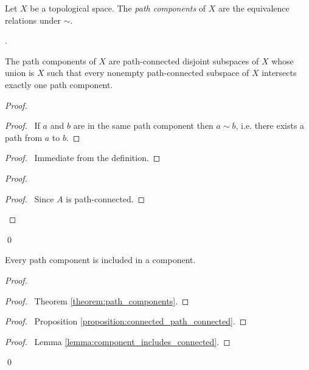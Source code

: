 \begin{definition}
    Let $X$ be a topological space. The \emph{path components} of $X$ are
    the equivalence relations under $\sim$.
\end{definition}.

\begin{theorem}
    \label{theorem:path_components}
    The path components of $X$ are path-connected disjoint subspaces of $X$
    whose union is $X$ such that every nonempty path-connected subspace of $X$
    intersects exactly one path component.
\end{theorem}

\begin{proof}
    \pf
    \begin{proof}
        \pf\ If $a$ and $b$ are in the same path component then $a \sim b$,
        i.e. there exists a path from $a$ to $b$.
    \end{proof}
    \begin{proof}
        \pf\ Immediate from the definition.
    \end{proof}
    \begin{proof}
        \begin{proof}
            \pf\ Since $A$ is path-connected.
        \end{proof}
    \end{proof}
    \qed
\end{proof}

\begin{proposition}
    \label{proposition:path_component_sub_component}
    Every path component is included in a component.
\end{proposition}

\begin{proof}
    \pf
    \begin{proof}
        \pf\ Theorem \ref{theorem:path_components}.
    \end{proof}
    \begin{proof}
        \pf\ Proposition \ref{proposition:connected_path_connected}.
    \end{proof}
    \begin{proof}
        \pf\ Lemma \ref{lemma:component_includes_connected}.
    \end{proof}
    \qed
\end{proof}

